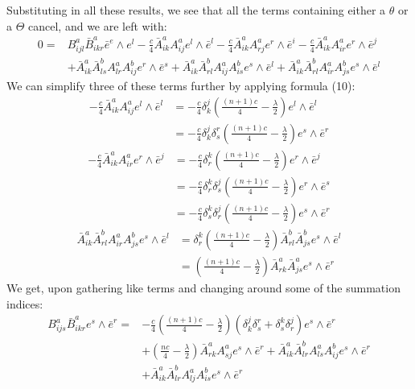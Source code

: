 \documentclass[11pt]{amsart}
\theoremstyle{definition}
\begin{document}
Substituting in all these results, we see that all the terms containing either a $\theta$ or a $\Theta$ cancel, and we are left with:
%
\begin{align*}
0 =& B^a_{ijl} \bar{B}^a_{ikr} \bar{e}^e \wedge e^l - \frac{c}{4} \bar{A}^a_{ik} A^a_{ij} e^l \wedge \bar{e}^l - \frac{c}{4} \bar{A}^a_{ik} A^a_{rj} e^r \wedge \bar{e}^i - \frac{c}{4} \bar{A}^a_{ik} A^a_{ir} e^r \wedge \bar{e}^j \\
&+ \bar{A}^a_{ik} \bar{A}^b_{ls} A^a_{lr} A^b_{ij} e^r \wedge \bar{e}^s + \bar{A}^a_{ik} \bar{A}^b_{rl} A^a_{ij} A^b_{is}  e^s \wedge \bar{e}^l +
\bar{A}^a_{ik} \bar{A}^b_{rl} A^a_{ir} A^b_{js} e^s \wedge \bar{e}^l
\end{align*}
%
We can simplify three of these terms further by applying formula (10):
%
\begin{align*}
 - \frac{c}{4} \bar{A}^a_{ik} A^a_{ij} e^l \wedge \bar{e}^l &= - \frac{c}{4} \delta^j_k \left( \frac{(n+1)c}{4} - \frac{\lambda}{2} \right) e^l \wedge \bar{e}^l \\
&= - \frac{c}{4} \delta^j_k \delta^r_s \left( \frac{(n+1)c}{4} - \frac{\lambda}{2} \right) e^s \wedge \bar{e}^r
\end{align*}
%
\begin{align*}
- \frac{c}{4} \bar{A}^a_{ik} A^a_{ir} e^r \wedge \bar{e}^j &= - \frac{c}{4} \delta^k_r \left( \frac{(n+1)c}{4} - \frac{\lambda}{2} \right) e^r \wedge \bar{e}^j \\
&= - \frac{c}{4} \delta^k_r \delta^j_s \left( \frac{(n+1)c}{4} - \frac{\lambda}{2} \right) e^r \wedge \bar{e}^s \\
&= - \frac{c}{4} \delta^k_s \delta^j_r \left( \frac{(n+1)c}{4} - \frac{\lambda}{2} \right) e^s \wedge \bar{e}^r
\end{align*} 
%
\begin{align*}
\bar{A}^a_{ik} \bar{A}^b_{rl} A^a_{ir} A^b_{js} e^s \wedge \bar{e}^l  &= \delta^k_r \left( \frac{(n+1)c}{4} - \frac{\lambda}{2} \right)  \bar{A}^b_{rl} \bar{A}^b_{js} e^s \wedge \bar{e}^l \\
&= \left( \frac{(n+1)c}{4} - \frac{\lambda}{2} \right)  \bar{A}^a_{rk} \bar{A}^a_{js} e^s \wedge \bar{e}^r
\end{align*}
%
We get, upon gathering like terms and changing around some of the summation indices:
%
\begin{align*}
B^a_{ijs} \bar{B}^a_{ikr} e^s \wedge \bar{e}^r =& - \frac{c}{4} \left( \frac{(n+1)c}{4} - \frac{\lambda}{2} \right) \left( \delta^j_k \delta^r_s + \delta^k_s \delta^j_r \right) e^s \wedge \bar{e}^r \\
&+ \left( \frac{nc}{4} - \frac{\lambda}{2} \right) \bar{A}^a_{rk} A^a_{sj} e^s \wedge \bar{e}^r + \bar{A}^a_{ik} \bar{A}^b_{lr} A^a_{ls} A^b_{ij} e^s \wedge \bar{e}^r \\
&+ \bar{A}^a_{ik} \bar{A}^b_{lr} A^a_{lj} A^b_{is} e^s \wedge \bar{e}^r
\end{align*}
\end{document}
